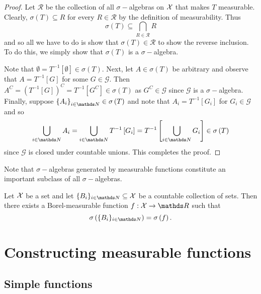 \begin{proof}
Let $\mathcal{R}$ be the collection of all $\sigma-$algebras on
$\mathcal{X}$ that makes $T$ measurable. Clearly, $\sigma\left(T\right)\subseteq R$
for every $R\in\mathcal{\mathcal{R}}$ by the definition of measurability.
Thus 
\[
\sigma\left(T\right)\subseteq\bigcap_{R\in\mathcal{R}}R
\]
and so all we have to do is show that $\sigma\left(T\right)\in\mathcal{\mathcal{R}}$
to show the reverse inclusion. To do this, we simply show that $\sigma\left(T\right)$
is a $\sigma-$algebra.

Note that $\emptyset=T^{-1}\left[\emptyset\right]\in\sigma\left(T\right).$
Next, let $A\in\sigma\left(T\right)$ be arbitrary and observe that
$A=T^{-1}\left[G\right]$ for some $G\in\mathcal{G}$. Then $A^{C}=\left(T^{-1}\left[G\right]\right)^{C}=T^{-1}\left[G^{C}\right]\in\sigma\left(T\right)$
as $G^{C}\in\mathcal{G}$ since $\mathcal{G}$ is a $\sigma-$algebra.
Finally, suppose $\left\{ A_{i}\right\} _{i\in\N}\in\sigma\left(T\right)$
and note that $A_{i}=T^{-1}\left[G_{i}\right]$ for $G_{i}\in\mathcal{G}$
and so
\[
\bigcup_{i\in\N}A_{i}=\bigcup_{i\in\N}T^{-1}\left[G_{i}\right]=T^{-1}\left[\bigcup_{i\in\N}G_{i}\right]\in\sigma\left(T\right)
\]
 since $\mathcal{G}$ is closed under countable unions. This completes
the proof.
\end{proof}
Note that $\sigma-$algebras generated by measurable functions constitute
an important subclass of all $\sigma-$algebras.
\begin{prop}
\label{prop:countablyGeneratedSigmaAlgebrasMeasFunc}Let $\mathcal{X}$ be
a set and let $\{B_{i}\}_{i\in\N}\subseteq\X$ be a countable collection
of sets. Then there exists a Borel-measurable function $f:\X\to\R$
such that 
\[
\sigma\left(\{B_{i}\}_{i\in\N}\right)=\sigma\left(f\right).
\]
\end{prop}


\section{Constructing measurable functions}

\subsection{Simple functions}

